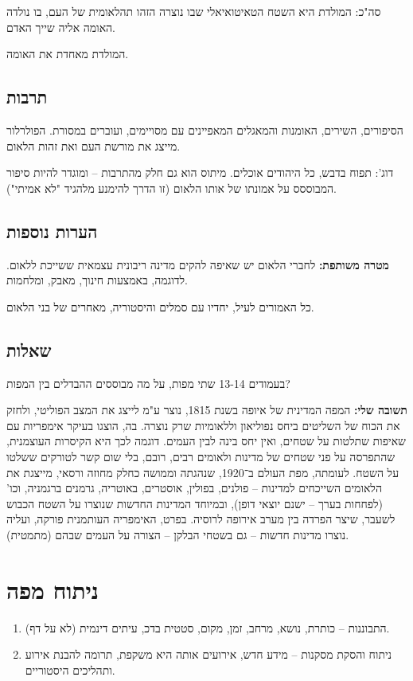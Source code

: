 \documentclass[]{article}
\begin{document}
	סה"כ: המולדת היא השטח הטאיטואיאלי שבו נוצרה הזהו תהלאומית של העם, בו נולדה האומה אליה שייך האדם. 
	
	המולדת מאחדת את האומה. 
	
	\subsection{תרבות}
	הסיפורים, השירים, האומנות והמאגלים המאפיינים עם מסויימים, ועוברים במסורת. הפולרלור מייצג את מורשת העם ואת זהות הלאום. 
	
	דוג': תפוח בדבש, כל היהודים אוכלים. מיתוס הוא גם חלק מהתרבות – ומוגדר להיות סיפור המבוססס על אמונתו של אותו הלאום (זו הדרך להימנע מלהגיד "לא אמיתי"). 
	
	\subsection{הערות נוספות}
	
	\textbf{מטרה משותפת: }לחברי הלאום יש שאיפה להקים מדינה ריבונית עצמאית ששייכת ללאום. לדוגמה, באמצעות חינוך, מאבק, ומלחמות. 
	
	כל האמורים לעיל, יחדיו עם סמלים והיסטוריה, מאחרים של בני הלאום. 
	
	\subsection{שאלות}
	בעמודים 13-14 שתי מפות, על מה מבוססים ההבדלים בין המפות? 
	
	\textbf{תשובה שלי: }המפה המדינית של איופה בשנת 1815, נוצר ע"מ לייצג את המצב הפוליטי, ולחזק את הכוח של השליטים ביחס נפוליאון וללאומיות שרק נוצרה. בה, הוצגו בעיקר אימפריות עם שאיפות שתלטות על שטחים, ואין יחס בינה לבין העמים. דוגמה לכך היא הקיסרות העוצמנית, שהתפרסה על פני שטחים של מדינות ולאומים רבים, רובם, בלי שום קשר לטורקים ששלטו על השטח. לעומתה, מפת העולם ב־1920, שנהגתה וממושה כחלק מחוזה ורסאי, מייצגת את הלאומים השייכחים למדינות – פולנים, בפולין, אוסטרים, באוטריה, גרמנים ברגמניה, וכו' (לפחחות בערך – ישנם יוצאי דופן), ובמיוחד המדינות החדשות שנוצרו על השטח הכבוש לשעבר, שיצר הפרדה בין מערב אירופה לרוסיה. בפרט, האימפריה העותמנית פורקה, ועליה נוצרו מדינות חדשות – גם בשטחי הבלקן – הצורה על העמים שבהם (מתמטית). 
	
	\section{ניתוח מפה}
	
	\begin{enumerate}
		\item התבוננות – כותרת, נושא, מרחב, זמן, מקום, סטטית בדכ, עיתים דינמית (לא על דף). 
		\item ניתוח והסקת מסקנות – מידע חדש, אירועים אותה היא משקפת, תרומה להבנת אירוע ותהליכים היסטוריים. 
	\end{enumerate}
	
\end{document}
